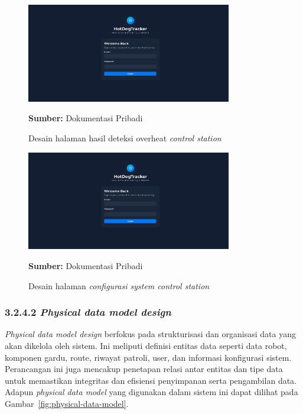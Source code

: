 \begin{figure}[H]
  \centering
  \includegraphics[width=0.8\textwidth]{gambar/bab3/auth-ui.png}
  \caption{Desain halaman hasil deteksi overheat \emph{control station}}
  \label{fig:control-station-robot-feature}
  \footnotesize{\textbf{Sumber:} Dokumentasi Pribadi}
\end{figure}


\begin{figure}[H]
  \centering
  \includegraphics[width=0.8\textwidth]{gambar/bab3/auth-ui.png}
  \caption{Desain halaman \emph{configurasi system control station}}
  \label{fig:control-station-robot-setting}
  \footnotesize{\textbf{Sumber:} Dokumentasi Pribadi}
\end{figure}


\subsubsection{3.2.4.2 \emph{Physical data model design}}
\emph{Physical data model design} berfokus pada strukturisasi dan organisasi data yang akan dikelola oleh sistem. Ini meliputi definisi entitas data seperti data robot, komponen gardu, route, riwayat patroli, user, dan informasi konfigurasi sistem. Perancangan ini juga mencakup penetapan relasi antar entitas dan tipe data untuk memastikan integritas dan efisiensi penyimpanan serta pengambilan data. Adapun \emph{physical data model} yang digunakan dalam sistem ini dapat dilihat pada Gambar~\ref{fig:physical-data-model}.

